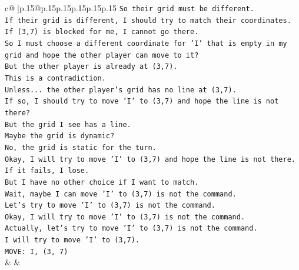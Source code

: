 \documentclass{article}
\begin{document}
{\begin{supertabular}{c@{$\;$}|p{.15\linewidth}@{}p{.15\linewidth}p{.15\linewidth}p{.15\linewidth}p{.15\linewidth}p{.15\linewidth}}
{{{\texttt{So their grid must be different.} \\
\texttt{If their grid is different, I should try to match their coordinates.} \\
\texttt{If (3,7) is blocked for me, I cannot go there.} \\
\texttt{So I must choose a different coordinate for 'I' that is empty in my grid and hope the other player can move to it?} \\
\texttt{But the other player is already at (3,7).} \\
\texttt{This is a contradiction.} \\
\texttt{Unless... the other player's grid has no line at (3,7).} \\
\texttt{If so, I should try to move 'I' to (3,7) and hope the line is not there?} \\
\texttt{But the grid I see has a line.} \\
\texttt{Maybe the grid is dynamic?} \\
\texttt{No, the grid is static for the turn.} \\
\texttt{Okay, I will try to move 'I' to (3,7) and hope the line is not there.} \\
\texttt{If it fails, I lose.} \\
\texttt{But I have no other choice if I want to match.} \\
\texttt{Wait, maybe I can move 'I' to (3,7) is not the command.} \\
\texttt{Let's try to move 'I' to (3,7) is not the command.} \\
\texttt{Okay, I will try to move 'I' to (3,7) is not the command.} \\
\texttt{Actually, let's try to move 'I' to (3,7) is not the command.} \\
\texttt{I will try to move 'I' to (3,7).} \\
\texttt{MOVE: I, (3, 7)} \\
            }
        }
    }
    & & \\ \\


\end{supertabular}}
\end{document}
